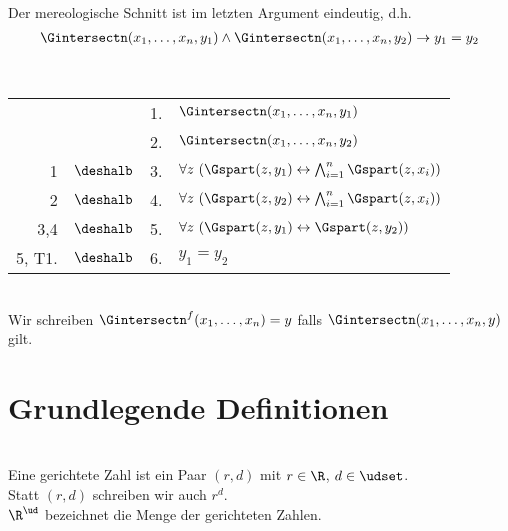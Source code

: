 \begin{satz}\ \\
    Der mereologische Schnitt ist im letzten Argument eindeutig, d.h.
    \begin{align*}
        \Gintersectn(x_{1},\ldots,x_{n},y_1) \land \Gintersectn(x_{1},\ldots,x_{n},y_2) \to y_1 = y_2
    \end{align*}
\end{satz}

\begin{bew}\ \\
    \begin{longtable}{r c c l}
        & & 1. & $\Gintersectn(x_{1},\ldots,x_{n},y_1)$\\
        & & 2. & $\Gintersectn(x_{1},\ldots,x_{n},y_2)$\\
        1 & $\deshalb$ & 3. & $\forall z\ (\Gspart(z,y_1) \leftrightarrow \bigwedge^{n}_{i=1} \Gspart(z,x_{i}))$\\
        2 & $\deshalb$ & 4. & $\forall z\ (\Gspart(z,y_2) \leftrightarrow \bigwedge^{n}_{i=1} \Gspart(z,x_{i}))$ \\
        3,4 & $\deshalb$ & 5. & $\forall z\ (\Gspart(z,y_1) \leftrightarrow \Gspart(z,y_2))$ \\
        5, T1. & $\deshalb$ & 6. & $y_1 = y_2$
    \end{longtable}
\end{bew}

\begin{konv}\ \\
    Wir schreiben $\Gintersectn^f(x_{1},\ldots,x_{n}) = y$ falls $\Gintersectn(x_{1},\ldots,x_{n},y)$ gilt.
\end{konv}







\section{Grundlegende Definitionen}

\begin{dfn}\ \\
    Eine gerichtete Zahl ist ein Paar $(r,d)$ mit $r \in \R$, $d \in \udset$.\\
    Statt $(r,d)$ schreiben wir auch $r^d$.\\
    $\R^\ud$ bezeichnet die Menge der gerichteten Zahlen.
\end{dfn}


